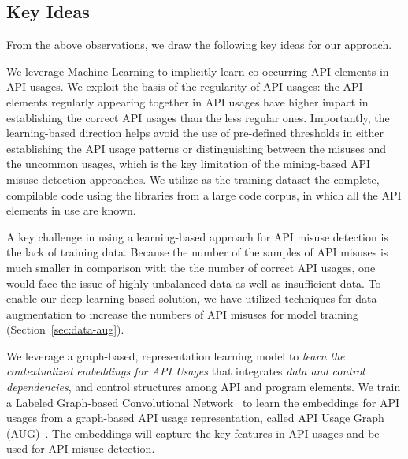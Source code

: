 \subsection{Key Ideas}
\label{sec:key-ideas}

From the above observations, we draw the following key ideas for our
approach.

\begin{key-idea}
We leverage Machine Learning to implicitly learn co-occurring API
elements in API usages. We exploit the basis of the regularity of API
usages: the API elements regularly appearing together in API usages
have higher impact in establishing the correct API usages than the
less regular ones. Importantly, the learning-based direction helps
avoid the use of pre-defined thresholds in either establishing the API
usage patterns or distinguishing between the misuses and the uncommon
usages, which is the key limitation of the mining-based API misuse
detection approaches. We utilize as the training dataset the complete,
compilable code using the libraries from a large code corpus, in which
all the API elements in use are known.
\end{key-idea}


\begin{key-idea}
A key challenge in using a learning-based approach for API misuse
detection is the lack of training data. Because the number of the
samples of API misuses is much smaller in comparison with the the
number of correct API usages, one would face the issue of highly
unbalanced data as well as insufficient data. To enable our
deep-learning-based solution, we have utilized techniques for
data augmentation to increase the numbers of API misuses for model
training (Section~\ref{sec:data-aug}).
\end{key-idea}


\begin{key-idea} We leverage a graph-based, representation
  learning model to {\em learn the contextualized embeddings for API
    Usages} that integrates {\em data and control dependencies}, and
  control structures among API and program elements. We train a
  Labeled Graph-based Convolutional Network~\cite{label-gcn} to learn
  the embeddings for API usages from a graph-based API usage
  representation, called API Usage Graph (AUG)~\cite{msr19}. The
  embeddings will capture the key features in API usages and be used
  for API misuse detection.
\end{key-idea}
